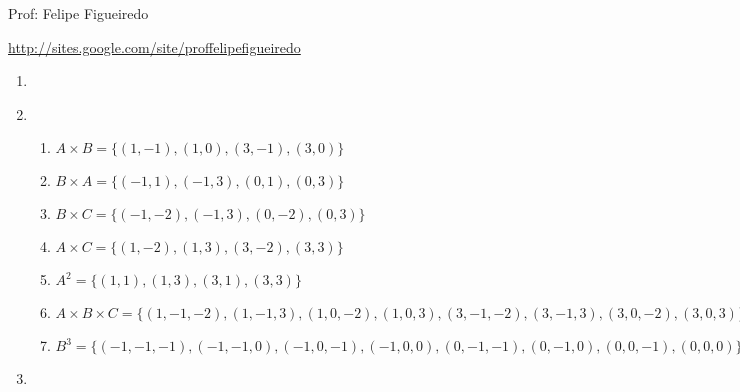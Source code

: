 \documentclass[a4paper]{article}
\begin{document}
\parbox[c]{.825\textwidth}{\raggedright%
{Prof: Felipe Figueiredo\par}
{\url{http://sites.google.com/site/proffelipefigueiredo}}

\vspace{1cm}
}


\begin{enumerate}

\item 

\item \ %

  \begin{enumerate}
  \item $A \times B = \{(1,-1), (1,0), (3,-1), (3,0)\}$
  \item $B \times A = \{(-1,1), (-1,3), (0,1), (0,3)\}$
  \item $B \times C = \{(-1,-2), (-1,3), (0,-2), (0,3)\}$
  \item $A \times C = \{(1,-2), (1,3), (3,-2), (3,3)\}$
  \item $A^2 = \{(1,1), (1,3), (3,1), (3,3)\}$
  \item $A \times B \times C = \{(1,-1,-2), (1,-1,3), (1,0,-2),
    (1,0,3), (3,-1,-2), (3,-1,3), (3,0,-2), (3,0,3)\}$
  \item $B^3 = \{(-1,-1,-1), (-1,-1,0), (-1,0,-1), (-1,0,0),
    (0,-1,-1), (0,-1,0), (0,0,-1), (0,0,0)\}$
  \end{enumerate}

\item \ %


\end{enumerate}
\end{document}
